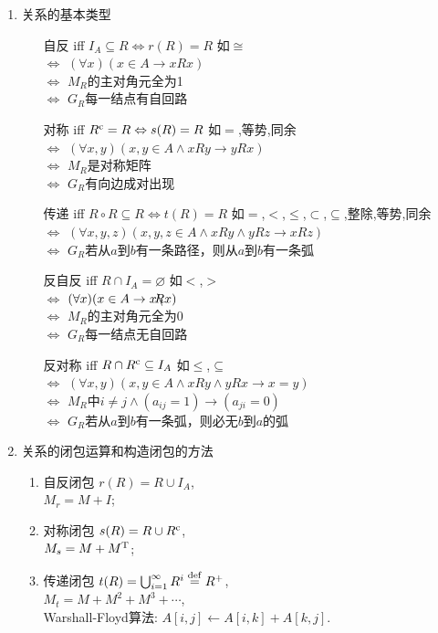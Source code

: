 \begin{enumerate}
\item 关系的基本类型
\begin{enumerate}
\item[自反] iff $I_A\subseteq R \Leftrightarrow r(R)=R$ \hfill 如$\cong$ \\
    $\Leftrightarrow$ $(\forall x)(x\in A\to xRx)$\\
    $\Leftrightarrow$ $M_R$的主对角元全为1\\
    $\Leftrightarrow$ $G_R$每一结点有自回路
\item[对称] iff $R^{\mathrm{c}}=R \Leftrightarrow s(R)=R$ \hfill 如$=$,等势,同余 \\
    $\Leftrightarrow$ $(\forall x, y)(x, y\in A\wedge xRy\to yRx)$\\
    $\Leftrightarrow$ $M_R$是对称矩阵\\
    $\Leftrightarrow$ $G_R$有向边成对出现
\item[传递] iff $R\circ R\subseteq R \Leftrightarrow t(R)=R$ \hfill 如$=$,$<$,$\le$,$\subset$,$\subseteq$,整除,等势,同余 \\
    $\Leftrightarrow$ $(\forall x, y, z)(x,y,z\in A\wedge xRy\wedge yRz\to xRz)$\\
    $\Leftrightarrow$ $G_R$若从$a$到$b$有一条路径，则从$a$到$b$有一条弧
\item[反自反] iff $R\cap I_A=\varnothing$ \hfill 如$<$,$>$ \\
    $\Leftrightarrow$ $(\forall x)(x\in A\to x\backslash\!\!\!\! R x)$\\
    $\Leftrightarrow$ $M_R$的主对角元全为0\\
    $\Leftrightarrow$ $G_R$每一结点无自回路
\item[反对称] iff $R\cap R^{\mathrm{c}}\subseteq I_A$ \hfill 如$\le$,$\subseteq$ \\
    $\Leftrightarrow$ $(\forall x,y)(x,y\in A\wedge xRy\wedge yRx\to x=y)$\\
    $\Leftrightarrow$ $M_R$中$i\neq j\wedge(a_{ij}=1)\to(a_{ji}=0)$\\
    $\Leftrightarrow$ $G_R$若从$a$到$b$有一条弧，则必无$b$到$a$的弧
\end{enumerate}

\item 关系的闭包运算和构造闭包的方法
\begin{enumerate}
\item 自反闭包 $r(R)=R\cup I_A$,\\
$M_r=M+I$;
\item 对称闭包 $s(R)=R\cup R^{\mathrm{c}}$,\\
$M_s=M+M^{\mathrm{T}}$;
\item 传递闭包 $t(R)=\bigcup_{i=1}^{\infty}R^i\stackrel{\rm def}{=} R^+$,\\
$M_t=M+M^2+M^3+\cdots$,\\
Warshall-Floyd算法: $A[i,j]\gets A[i,k]+A[k,j]$.
\end{enumerate}


\end{enumerate}
